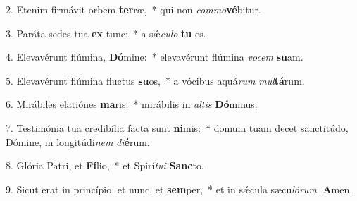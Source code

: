 2. Etenim firmávit orbem \textbf{ter}ræ,~*  qui non \textit{com}\textit{mo}\textbf{vé}bitur.\

3. Paráta sedes tua \textbf{ex} tunc:~*  a sǽ\textit{cu}\textit{lo} \textbf{tu} es.\

4. Elevavérunt flúmina, \textbf{Dó}mine:~*  elevavérunt flúmina \textit{vo}\textit{cem} \textbf{su}am.\

5. Elevavérunt flúmina fluctus \textbf{su}os,~*  a vócibus aquá\textit{rum} \textit{mul}\textbf{tá}rum.\

6. Mirábiles elatiónes \textbf{ma}ris:~*  mirábilis in \textit{al}\textit{tis} \textbf{Dó}minus.\

7. Testimónia tua credibília facta sunt \textbf{ni}mis:~*  domum tuam decet sanctitúdo, Dómine, in longitúdi\textit{nem} \textit{di}\textbf{é}rum.\

8. Glória Patri, et \textbf{Fí}lio,~*  et Spirí\textit{tu}\textit{i} \textbf{Sanc}to.\

9. Sicut erat in princípio, et nunc, et \textbf{sem}per,~*  et in sǽcula sæcu\textit{ló}\textit{rum}. \textbf{A}men.\

